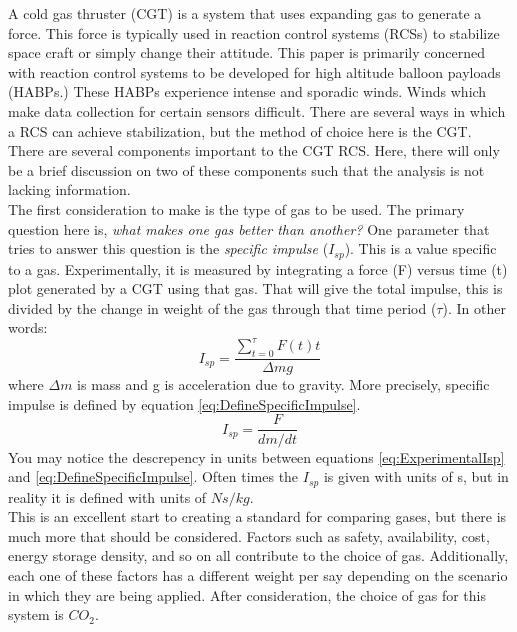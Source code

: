 A cold gas thruster (CGT) is a system that uses expanding gas to generate a force. This force is typically used in reaction control systems (RCSs) to stabilize space craft or simply change their attitude. This paper is primarily concerned with reaction control systems to be developed for high altitude balloon payloads (HABPs.) These HABPs experience intense and sporadic winds. Winds which make data collection for certain sensors difficult. There are several ways in which a RCS can achieve stabilization, but the method of choice here is the CGT.\\
There are several components important to the CGT RCS. Here, there will only be a brief discussion on two of these components such that the analysis is not lacking information. \\
The first consideration to make is the type of gas to be used. The primary question here is, \textit{what makes one gas better than another?} One parameter that tries to answer this question is the \textit{specific impulse} ($I_{sp}$). This is a value specific to a gas. Experimentally, it is measured by integrating a force (F) versus time (t) plot generated by a CGT using that gas. That will give the total impulse, this is divided by the change in weight of the gas through that time period ($\tau$). In other words:
\begin{equation}\label{eq:ExperimentalIsp}
I_{sp}=\frac{\sum\limits_{t=0}^{\tau} F(t)t}{\Delta mg}
\end{equation}%
%
%
%
%
%
where $\Delta m$ is mass and g is acceleration due to gravity. More precisely, specific impulse is defined by  equation \ref{eq:DefineSpecificImpulse}.
\begin{equation}\label{eq:DefineSpecificImpulse}
I_{sp}=\frac{F}{dm/dt}
\end{equation}
You may notice the descrepency in units between equations \ref{eq:ExperimentalIsp} and \ref{eq:DefineSpecificImpulse}. Often times the $I_{sp}$ is given with units of s, but in reality it is defined with units of $Ns/kg$.\\
This is an excellent start to creating a standard for comparing gases, but there is much more that should be considered. Factors such as safety, availability, cost, energy storage density, and so on all contribute to the choice of gas. Additionally, each one of these factors has a different weight per say depending on the scenario in which they are being applied. After consideration, the choice of gas for this system is $CO_2$.\\
